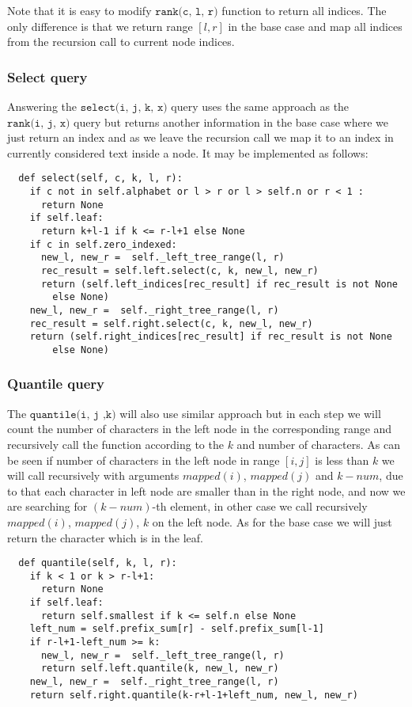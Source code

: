 Note that it is easy to modify $\texttt{rank(c, l, r)}$ function to return all indices. The only difference is that we return range $[l, r]$ in the base case and map all indices from the recursion call to current node indices.

\subsubsection{Select query}
Answering the $\texttt{select(i, j, k, x)}$ query uses the same approach as the $\texttt{rank(i, j, x)}$ query but returns another information in the base case where we just return an index and as we leave the recursion call we map it to an index in currently considered text inside a node. It may be implemented as follows:

\begin{verbatim}
  def select(self, c, k, l, r):
    if c not in self.alphabet or l > r or l > self.n or r < 1 :
      return None
    if self.leaf:
      return k+l-1 if k <= r-l+1 else None
    if c in self.zero_indexed:
      new_l, new_r =  self._left_tree_range(l, r)
      rec_result = self.left.select(c, k, new_l, new_r)
      return (self.left_indices[rec_result] if rec_result is not None 
        else None)
    new_l, new_r =  self._right_tree_range(l, r)
    rec_result = self.right.select(c, k, new_l, new_r)
    return (self.right_indices[rec_result] if rec_result is not None
        else None)
\end{verbatim}

\subsubsection{Quantile query}
The $\texttt{quantile(i, j ,k)}$ will also use similar approach but in each step we will count the number of characters in the left node in the corresponding range and recursively call the function according to the $k$ and number of characters. As can be seen if number of characters in the left node in range $[i, j]$ is less than $k$ we will call recursively with arguments $mapped(i)$, $mapped(j)$ and $k - num$, due to that each character in left node are smaller than in the right node, and now we are searching for $(k-num)$-th element, in other case we call recursively $mapped(i)$, $mapped(j)$, $k$ on the left node. As for the base case we will just return the character which is in the leaf.

\begin{verbatim}
  def quantile(self, k, l, r):
    if k < 1 or k > r-l+1:
      return None
    if self.leaf:
      return self.smallest if k <= self.n else None
    left_num = self.prefix_sum[r] - self.prefix_sum[l-1]
    if r-l+1-left_num >= k:
      new_l, new_r =  self._left_tree_range(l, r)
      return self.left.quantile(k, new_l, new_r)
    new_l, new_r =  self._right_tree_range(l, r)
    return self.right.quantile(k-r+l-1+left_num, new_l, new_r)
\end{verbatim}

